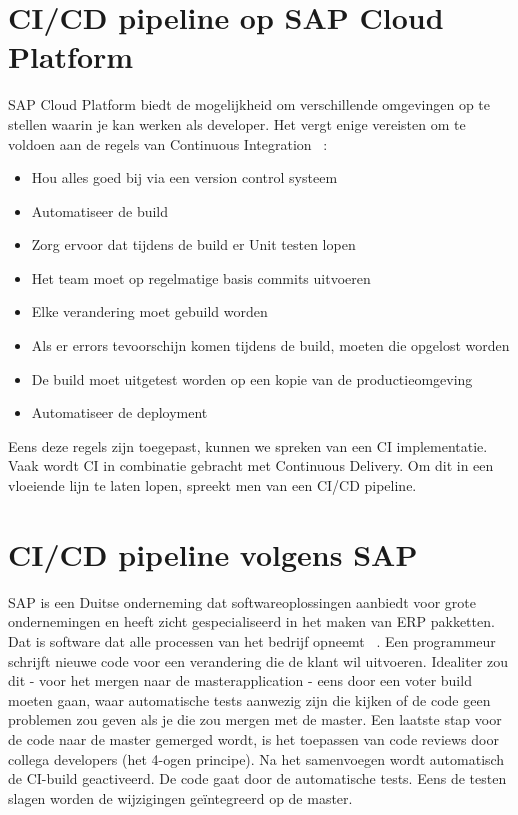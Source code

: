 \section{CI/CD pipeline op SAP Cloud Platform}
\label{sec:ci-cd-op-sap-cloud-platform}
SAP Cloud Platform biedt de mogelijkheid om verschillende omgevingen op te stellen waarin je kan werken als developer. Het vergt enige vereisten om te voldoen aan de regels van Continuous Integration ~\autocite{Kramer2018}:
\begin{itemize}
    \item Hou alles goed bij via een version control systeem
    \item Automatiseer de build
    \item Zorg ervoor dat tijdens de build er Unit testen lopen
    \item Het team moet op regelmatige basis commits uitvoeren
    \item Elke verandering moet gebuild worden
    \item Als er errors tevoorschijn komen tijdens de build, moeten die opgelost worden
    \item De build moet uitgetest worden op een kopie van de productieomgeving
    \item Automatiseer de deployment
\end{itemize}
Eens deze regels zijn toegepast, kunnen we spreken van een CI implementatie.
Vaak wordt CI in combinatie gebracht met Continuous Delivery. Om dit in een vloeiende lijn te laten lopen, spreekt men van een CI/CD pipeline.

\section{CI/CD pipeline volgens SAP}
\label{sec:ci-cd-pipeling-volgens-sap}
SAP is een Duitse onderneming dat softwareoplossingen aanbiedt voor grote ondernemingen en heeft zicht gespecialiseerd in het maken van ERP pakketten. Dat is software dat alle processen van het bedrijf opneemt ~\autocite{SAPERP2019}.
Een programmeur schrijft nieuwe code voor een verandering die de klant wil uitvoeren. Idealiter zou dit - voor het mergen naar de masterapplication - eens door een voter build moeten gaan, waar automatische tests aanwezig zijn die kijken of de code geen problemen zou geven als je die zou mergen met de master. Een laatste stap voor de code naar de master gemerged wordt, is het toepassen van code reviews door collega developers (het 4-ogen principe).
Na het samenvoegen wordt automatisch de CI-build geactiveerd. De code gaat door de automatische tests. Eens de testen slagen worden de wijzigingen geïntegreerd op de master. 

